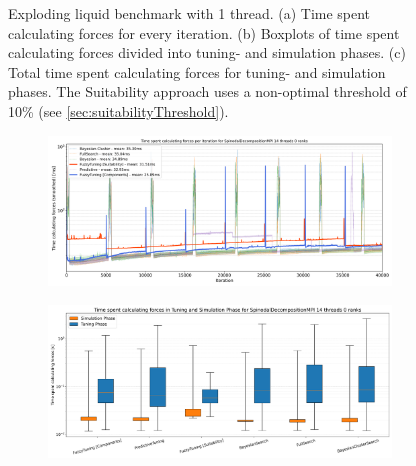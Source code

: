 \begin{figure}[H]
    \caption[Exploding liquid benchmark with 1 thread]{Exploding liquid benchmark with 1 thread. (a) Time spent calculating forces for every iteration. (b) Boxplots of time spent calculating forces divided into tuning- and simulation phases. (c) Total time spent calculating forces for tuning- and simulation phases. The Suitability approach uses a non-optimal threshold of 10\% (see \autoref{sec:suitabilityThreshold}).}
    \label{fig:explodingLiquid_1thread}
\end{figure}

\begin{figure}[H]
    \centering

    \begin{subfigure}[c]{\textwidth}
        \includegraphics[width=\columnwidth,trim={0cm 0.2cm 0cm 0.9cm},clip]{figures/Benchmark/SpinodalDecompositionMPI/SpinodalDecompositionMPI_timings_SpinodalDecompositionMPI_14_0.png}
        \caption{}
        \label{fig:spinodalTimings_14thread}
    \end{subfigure}


    \begin{subfigure}[c]{\textwidth}
        \includegraphics[width=\columnwidth,trim={0cm 0.5cm 0cm 1cm},clip]{figures/Benchmark/SpinodalDecompositionMPI/SpinodalDecompositionMPI_timings_boxplot_SpinodalDecompositionMPI_14_0.png}
        \caption{}
        \label{fig:spinodalBoxplot_14thread}
    \end{subfigure}


\end{figure}
